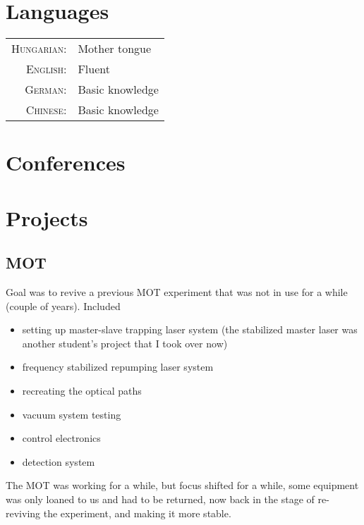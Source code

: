 \documentclass[10pt]{article}
\begin{document}
\section*{Languages}
\begin{tabular}{rl}
\textsc{Hungarian:}&Mother tongue\\
\textsc{English:}&Fluent\\
\textsc{German:}&Basic knowledge\\
\textsc{Chinese:}&Basic knowledge\\
\end{tabular}


\section*{Conferences}






\newpage

\section*{Projects}

\subsection*{MOT}

Goal was to revive a previous MOT experiment that was not in use for a while (couple of years). Included
\begin{itemize}
\item setting up master-slave trapping laser system (the stabilized master laser was another student's project that I took over now)
\item frequency stabilized repumping laser system
\item recreating the optical paths
\item vacuum system testing
\item control electronics
\item detection system
\end{itemize}
The MOT was working for a while, but focus shifted for a while, some equipment was only loaned to us and had to be returned, now back in the stage of re-reviving the experiment, and making it more stable.
\end{document}
